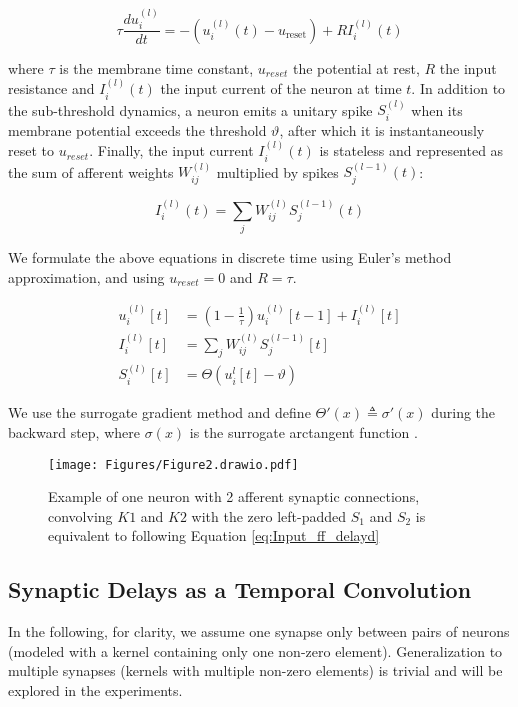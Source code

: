 \documentclass{article} \usepackage{iclr2024_conference,times}
\begin{document}
\begin{equation}
    \tau \frac{du_i^{(l)}}{dt} = -(u_i^{(l)}(t) - u_{\text{reset}}) + RI_i^{(l)}(t)
\end{equation}

where $\tau$ is the membrane time constant, $u_{reset}$ the potential at rest, $R$ the input resistance and $I_i^{(l)}(t)$ the input current of the neuron at time $t$. In addition to the sub-threshold dynamics, a neuron emits a unitary spike $S_i^{(l)}$ when its membrane potential exceeds the threshold $\vartheta$, after which it is instantaneously reset to $u_{reset}$. Finally, the input current $I_i^{(l)}(t)$ is stateless and represented as the sum of afferent weights $W_{ij}^{(l)}$ multiplied by spikes $S_j^{(l-1)}(t)$:

\begin{equation}
I_i^{(l)}(t) = \sum_{j} W_{ij}^{(l)} S_j^{(l-1)}(t)
\end{equation}

We formulate the above equations in discrete time using Euler's method approximation, and using $u_{reset} = 0$ and $R = \tau$.

\begin{align}
    u_i^{(l)}[t] &= (1 - \frac{1}{\tau})u _i^{(l)}[t-1] + I_i^{(l)}[t] \\
    I_i^{(l)}[t] &=  \sum_{j} W_{ij}^{(l)} S_j^{(l-1)}[t] \\
    S_i^{(l)}[t] &= \Theta(u_i^{l}[t] - \vartheta)
\end{align}

We use the surrogate gradient method \citep{neftci2018surrogate} and define $\Theta'(x) \triangleq \sigma'(x)$ during the backward step, where $\sigma(x)$ is the surrogate arctangent function \citep{plif}.
\begin{figure}[!ht]
    \centering
        \texttt{[image: Figures/Figure2.drawio.pdf]}
    \caption{Example of one neuron with 2 afferent synaptic connections, convolving $K1$ and $K2$ with the zero left-padded $S_1$ and $S_2$ is equivalent to following Equation \ref{eq:Input_ff_delayd} }
    
    \label{fig:methods_fig1}
\end{figure}

\subsection{Synaptic Delays as a Temporal Convolution}
\label{methods:conv}
In the following, for clarity, we assume one synapse only between pairs of neurons (modeled with a kernel containing only one non-zero element). Generalization to multiple synapses (kernels with multiple non-zero elements) is trivial and will be explored in the experiments.
\end{document}
